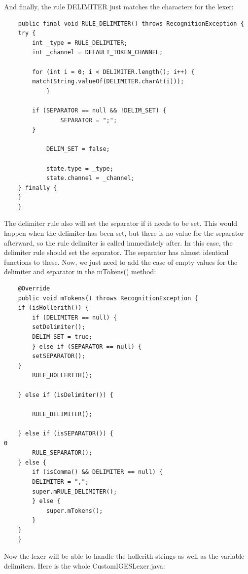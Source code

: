 And finally, the rule DELIMITER just matches the characters for the lexer:

\begin{Verbatim}
    public final void RULE_DELIMITER() throws RecognitionException {
	try {
	    int _type = RULE_DELIMITER;
	    int _channel = DEFAULT_TOKEN_CHANNEL;

	    for (int i = 0; i < DELIMITER.length(); i++) {
		match(String.valueOf(DELIMITER.charAt(i)));
            }

	    if (SEPARATOR == null && !DELIM_SET) {
                SEPARATOR = ";";
	    }

            DELIM_SET = false;
                
            state.type = _type;
            state.channel = _channel;
	} finally {
	}
    }
\end{Verbatim}

The delimiter rule also will set the separator if it needs to be set. This would happen when the delimiter has been set, but there is no value for the separator afterward, so the rule delimiter is called immediately after. In this case, the delimiter rule should set the separator. The separator has almost identical functions to these. Now, we just need to add the case of empty values for the delimiter and separator in the mTokens() method:

\begin{Verbatim}
    @Override
    public void mTokens() throws RecognitionException {
	if (isHollerith()) {
	    if (DELIMITER == null) {
		setDelimiter();
		DELIM_SET = true;
	    } else if (SEPARATOR == null) {
		setSEPARATOR();
	}
	    RULE_HOLLERITH();

	} else if (isDelimiter()) {

	    RULE_DELIMITER();

	} else if (isSEPARATOR()) {
0
	    RULE_SEPARATOR();
	} else {
	    if (isComma() && DELIMITER == null) {
		DELIMITER = ",";
		super.mRULE_DELIMITER();
	    } else {
	        super.mTokens();
	    }
	}
    }
\end{Verbatim}

Now the lexer will be able to handle the hollerith strings as well as the variable delimiters. Here is the whole CustomIGESLexer.java:

